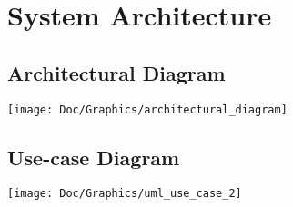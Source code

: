 \chapter{System Architecture}
\section{Architectural Diagram}
\texttt{[image: Doc/Graphics/architectural\_diagram]}
\newpage
\section{Use-case Diagram}
\texttt{[image: Doc/Graphics/uml\_use\_case\_2]}
